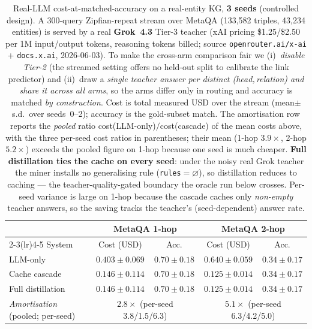 \begin{table}[t]
\centering
\small
\caption{Real-LLM cost-at-matched-accuracy on a real-entity KG, \textbf{3 seeds}
(controlled design). A 300-query Zipfian-repeat stream over MetaQA (133{,}582
triples, 43{,}234 entities) is served by a real \textbf{Grok~4.3} Tier-3 teacher
(xAI pricing \$1.25/\$2.50 per 1M input/output tokens, reasoning tokens billed;
source \texttt{openrouter.ai/x-ai} + \texttt{docs.x.ai}, 2026-06-03). To make the
cross-arm comparison fair we (i)~\emph{disable Tier-2} (the streamed setting
offers no held-out split to calibrate the link predictor) and (ii)~draw a
\emph{single teacher answer per distinct (head,\,relation) and share it across all
arms}, so the arms differ only in routing and accuracy is matched
\emph{by construction}. Cost is total measured USD over the stream
(mean$\pm$s.d.\ over seeds~0--2); accuracy is the gold-subset match. The
amortisation row reports the \emph{pooled} ratio cost(LLM-only)$/$cost(cascade)
of the mean costs above, with the three per-seed cost ratios in parentheses;
their mean (1-hop $3.9\times$, 2-hop $5.2\times$) exceeds the pooled figure on
1-hop because one seed is much cheaper. \textbf{Full distillation
ties the cache on every seed}: under the noisy real Grok teacher the miner
installs no generalising rule (\texttt{rules}$=\varnothing$), so distillation
reduces to caching --- the teacher-quality-gated boundary the oracle run below
crosses. Per-seed variance is large on 1-hop because the cascade caches only
\emph{non-empty} teacher answers, so the saving tracks the teacher's (seed-dependent)
answer rate.}
\label{tab:real_kg}
\begin{tabular}{lcccc}
\toprule
& \multicolumn{2}{c}{MetaQA 1-hop} & \multicolumn{2}{c}{MetaQA 2-hop} \\
\cmidrule(lr){2-3}\cmidrule(lr){4-5}
System & Cost (USD) & Acc. & Cost (USD) & Acc. \\
\midrule
LLM-only           & $0.403\pm0.069$ & $0.70\pm0.18$ & $0.640\pm0.059$ & $0.34\pm0.17$ \\
Cache cascade      & $0.146\pm0.114$ & $0.70\pm0.18$ & $0.125\pm0.014$ & $0.34\pm0.17$ \\
Full distillation  & $0.146\pm0.114$ & $0.70\pm0.18$ & $0.125\pm0.014$ & $0.34\pm0.17$ \\
\midrule
\multicolumn{1}{l}{\emph{Amortisation} (pooled; per-seed)}
  & \multicolumn{2}{c}{$\mathbf{2.8\times}$ (per-seed 3.8/1.5/6.3)}
  & \multicolumn{2}{c}{$\mathbf{5.1\times}$ (per-seed 6.3/4.2/5.0)} \\
\bottomrule
\end{tabular}


\end{table}
